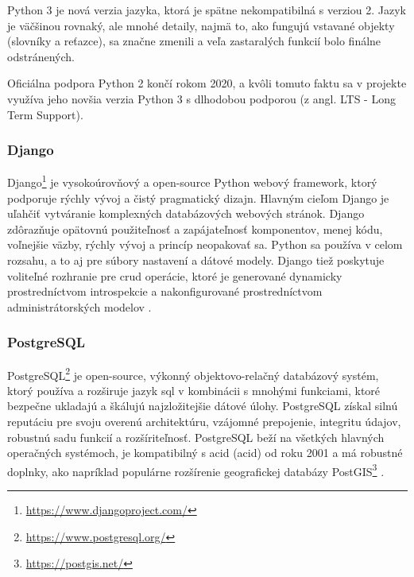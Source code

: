 Python 3 je nová verzia jazyka, ktorá je spätne nekompatibilná s verziou 2.
Jazyk je väčšinou rovnaký, ale mnohé detaily, najmä to, ako fungujú vstavané objekty
(slovníky a reťazce), sa značne zmenili a veľa zastaralých funkcií bolo finálne odstránených.

Oficiálna podpora Python 2 končí rokom 2020, a kvôli tomuto faktu sa v projekte využíva jeho
novšia verzia Python 3 s dlhodobou podporou (z angl. LTS - Long Term Support).

\subsubsection{Django}
\label{subsubsec:django}

Django\footnote{\url{https://www.djangoproject.com/}} je vysokoúrovňový a open-source Python
webový framework, ktorý podporuje rýchly vývoj a čistý pragmatický dizajn. Hlavným cieľom
Django je uľahčiť vytváranie komplexných databázových webových stránok. Django zdôrazňuje
opätovnú použiteľnosť a zapájateľnosť komponentov, menej kódu, voľnejšie väzby, rýchly vývoj
a princíp neopakovať sa. Python sa používa v celom rozsahu, a to aj pre súbory nastavení a dátové
modely. Django tiež poskytuje voliteľné rozhranie pre \acrshort{crud} operácie, ktoré je generované
dynamicky prostredníctvom introspekcie a nakonfigurované prostredníctvom administrátorských modelov \cite{django}.
\subsubsection{PostgreSQL}
\label{subsubsec:postgresql}

PostgreSQL\footnote{\url{https://www.postgresql.org/}} je open-source, výkonný objektovo-relačný
databázový systém, ktorý používa a rozširuje jazyk \acrshort{sql} v kombinácii s mnohými funkciami, ktoré bezpečne
ukladajú a škálujú najzložitejšie dátové úlohy. PostgreSQL získal silnú reputáciu pre svoju overenú
architektúru, vzájomné prepojenie, integritu údajov, robustnú sadu funkcií a rozšíriteľnosť. PostgreSQL
beží na všetkých hlavných operačných systémoch, je kompatibilný s \acrshort{acid} (\acrlong{acid})
od roku 2001 a má robustné doplnky, ako napríklad populárne rozšírenie geografickej databázy PostGIS\footnote{\url{https://postgis.net/}}
\cite{postgresql}.


